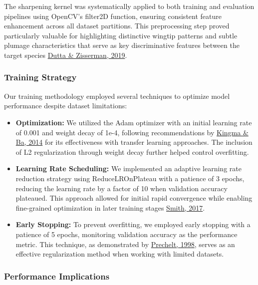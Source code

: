 \documentclass[a4paper,12pt]{article}
\begin{document}
The sharpening kernel was systematically applied to both training and evaluation pipelines using OpenCV's filter2D function, ensuring consistent feature enhancement across all dataset partitions. This preprocessing step proved particularly valuable for highlighting distinctive wingtip patterns and subtle plumage characteristics that serve as key discriminative features between the target species {\href{https://ieeexplore.ieee.org/document/8659085}{Dutta \& Zisserman, 2019}}.

\subsubsection{Training Strategy}

Our training methodology employed several techniques to optimize model performance despite dataset limitations:

\begin{itemize}
    \item \textbf{Optimization:} We utilized the Adam optimizer with an initial learning rate of 0.001 and weight decay of 1e-4, following recommendations by {\href{https://arxiv.org/abs/1412.6980}{Kingma \& Ba, 2014}} for its effectiveness with transfer learning approaches. The inclusion of L2 regularization through weight decay further helped control overfitting.
    
    \item \textbf{Learning Rate Scheduling:} We implemented an adaptive learning rate reduction strategy using ReduceLROnPlateau with a patience of 3 epochs, reducing the learning rate by a factor of 10 when validation accuracy plateaued. This approach allowed for initial rapid convergence while enabling fine-grained optimization in later training stages {\href{https://arxiv.org/abs/1506.01186}{Smith, 2017}}.
    
    \item \textbf{Early Stopping:} To prevent overfitting, we employed early stopping with a patience of 5 epochs, monitoring validation accuracy as the performance metric. This technique, as demonstrated by {\href{https://link.springer.com/chapter/10.1007/978-3-642-35289-8_5}{Prechelt, 1998}}, serves as an effective regularization method when working with limited datasets.
\end{itemize}


\subsubsection{Performance Implications}
\end{document}
